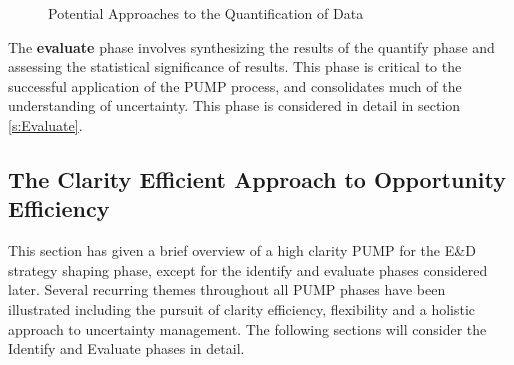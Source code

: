 \begin{figure}[!h]
  \centering
{} \quad
{}
\caption{Potential Approaches to the Quantification of Data}
\label{Figure:DefineFocus}
\end{figure}


The \textbf{evaluate} phase involves synthesizing the results of the quantify phase and assessing the statistical significance of results.
This phase is critical to the successful application of the PUMP process, and consolidates much of the understanding of uncertainty.
This phase is considered in detail in section \ref{s:Evaluate}.


\subsection{The Clarity Efficient Approach to Opportunity Efficiency}
This section has given a brief overview of a high clarity PUMP for the E\&D strategy shaping phase, except for the identify and evaluate phases considered later.
Several recurring themes throughout all PUMP phases have been illustrated including the pursuit of clarity efficiency, flexibility and a holistic approach to uncertainty management.
The following sections will consider the Identify and Evaluate phases in detail.


